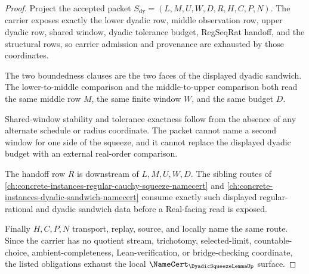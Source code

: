 \begin{proof}
Project the accepted packet $S_{\mathrm{dy}}=(L,M,U,W,D,R,H,C,P,N)$. The carrier exposes exactly the lower dyadic row, middle observation row, upper dyadic row, shared window, dyadic tolerance budget, RegSeqRat handoff, and the structural rows, so carrier admission and provenance are exhausted by those coordinates.

The two boundedness clauses are the two faces of the displayed dyadic sandwich. The lower-to-middle comparison and the middle-to-upper comparison both read the same middle row $M$, the same finite window $W$, and the same budget $D$.

Shared-window stability and tolerance exactness follow from the absence of any alternate schedule or radius coordinate. The packet cannot name a second window for one side of the squeeze, and it cannot replace the displayed dyadic budget with an external real-order comparison.

The handoff row $R$ is downstream of $L,M,U,W,D$. The sibling routes of \autoref{ch:concrete-instances-regular-cauchy-squeeze-namecert} and \autoref{ch:concrete-instances-dyadic-sandwich-namecert} consume exactly such displayed regular-rational and dyadic sandwich data before a Real-facing read is exposed.

Finally $H,C,P,N$ transport, replay, source, and locally name the same route. Since the carrier has no quotient stream, trichotomy, selected-limit, countable-choice, ambient-completeness, Lean-verification, or bridge-checking coordinate, the listed obligations exhaust the local $\NameCert_{\DyadicSqueezeLemmaUp}$ surface.
\end{proof}

